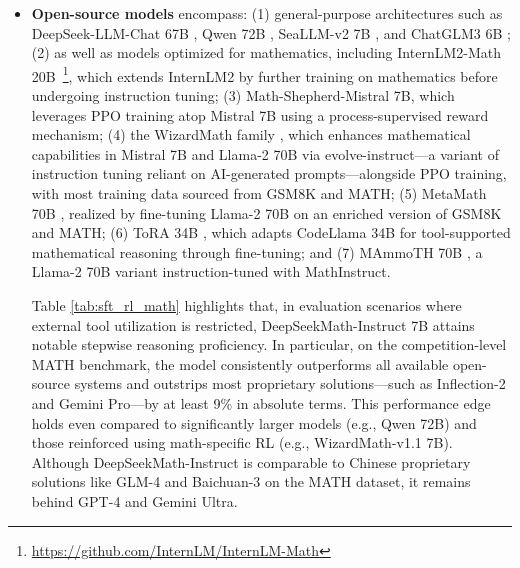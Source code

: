 \begin{itemize}[topsep=0pt]
\begin{itemize}[topsep=0pt]
    \item \textbf{Closed-source models}: Our baseline models comprise (1) the GPT series, notably GPT-4 \citep{gpt4} and GPT-4 Code Interpreter~\footnote{\url{https://openai.com/blog/chatgpt-plugins\#\#code-interpreter}}, (2) Gemini Ultra and Pro \citep{gemini}, (3) Inflection-2 \citep{inflection-2}, (4) Grok-1~\footnote{\url{https://x.ai/model-card}}, and models released by Chinese organizations such as (5) Baichuan-3~\footnote{\url{https://www.baichuan-ai.com}}, and (6) the newest GLM-4~\footnote{\url{https://open.bigmodel.cn/dev/api\#glm-4}} from the GLM series \citep{glm}.
\end{itemize}

The models listed serve general purposes and, for the most part, have been subjected to multiple stages of alignment refinement.

\item \textbf{Open-source models} encompass: (1) general-purpose architectures such as DeepSeek-LLM-Chat 67B \citep{deepseek-llm}, Qwen 72B \citep{qwen}, SeaLLM-v2 7B \citep{seallm}, and ChatGLM3 6B \citep{chatglm3}; (2) as well as models optimized for mathematics, including InternLM2-Math 20B~\footnote{\url{https://github.com/InternLM/InternLM-Math}}, which extends InternLM2 by further training on mathematics before undergoing instruction tuning; (3) Math-Shepherd-Mistral 7B, which leverages PPO training \citep{schulman2017proximal} atop Mistral 7B \citep{mistral} using a process-supervised reward mechanism; (4) the WizardMath family \citep{wizardmath}, which enhances mathematical capabilities in Mistral 7B and Llama-2 70B \citep{llama2} via evolve-instruct—a variant of instruction tuning reliant on AI-generated prompts—alongside PPO training, with most training data sourced from GSM8K and MATH; (5) MetaMath 70B \citep{metamath}, realized by fine-tuning Llama-2 70B on an enriched version of GSM8K and MATH; (6) ToRA 34B \cite{tora}, which adapts CodeLlama 34B for tool-supported mathematical reasoning through fine-tuning; and (7) MAmmoTH 70B \citep{MathInstruct}, a Llama-2 70B variant instruction-tuned with MathInstruct.

Table \ref{tab:sft_rl_math} highlights that, in evaluation scenarios where external tool utilization is restricted, DeepSeekMath-Instruct 7B attains notable stepwise reasoning proficiency. In particular, on the competition-level MATH benchmark, the model consistently outperforms all available open-source systems and outstrips most proprietary solutions—such as Inflection-2 and Gemini Pro—by at least 9\% in absolute terms. This performance edge holds even compared to significantly larger models (e.g., Qwen 72B) and those reinforced using math-specific RL (e.g., WizardMath-v1.1 7B). Although DeepSeekMath-Instruct is comparable to Chinese proprietary solutions like GLM-4 and Baichuan-3 on the MATH dataset, it remains behind GPT-4 and Gemini Ultra.


\end{itemize}
